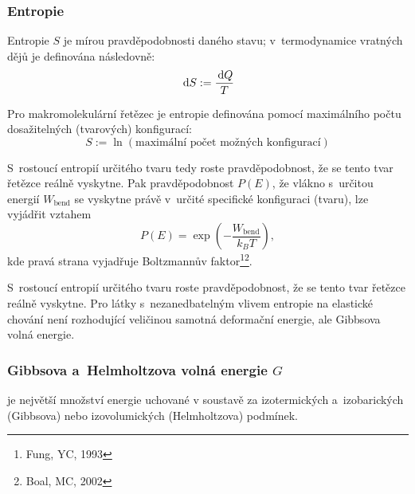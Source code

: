 
\subsubsection{Entropie}
Entropie $S$ je mírou pravděpodobnosti daného stavu; v~termodynamice vratných dějů je definována následovně:
\begin{equation}
\,\mathrm{d} S := \frac{\,\mathrm{d} Q}{T}
\end{equation}

Pro makromolekulární řetězec je entropie definována pomocí maximálního počtu dosažitelných (tvarových) konfigurací:
\begin{equation}
S := \ln\left(\text{maximální počet možných konfigurací}\right)
\end{equation}

S~rostoucí entropií určitého tvaru tedy roste pravděpodobnost, že se tento tvar řetězce reálně vyskytne.
Pak pravděpodobnost $P(E)$, že vlákno s~určitou energií $W_\text{bend}$ se vyskytne právě v~určité specifické konfiguraci (tvaru), lze vyjádřit vztahem
\begin{equation}
P(E) = \exp\left(-\frac{W_\text{bend}}{k_B T}\right),
\end{equation}
kde pravá strana vyjadřuje Boltzmannův faktor\footnote{Fung, YC, 1993}\footnote{Boal, MC, 2002}.

S~rostoucí entropií určitého tvaru roste pravděpodobnost, že se tento tvar řetězce reálně vyskytne.
Pro látky s~nezanedbatelným vlivem entropie na elastické chování není rozhodující veličinou samotná deformační energie, ale Gibbsova volná energie.

\subsubsection{Gibbsova a~Helmholtzova volná energie $G$}
je největší množství energie uchované v soustavě za izotermických a~izobarických (Gibbsova) nebo izovolumických (Helmholtzova) podmínek.

